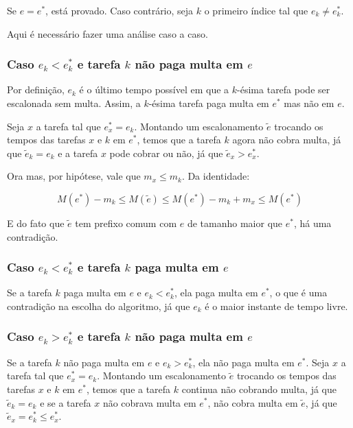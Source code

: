 Se $e = e^*$, está provado. Caso contrário, seja $k$ o primeiro índice tal que $e_k \neq e^*_k$.

Aqui é necessário fazer uma análise caso a caso.

\subsubsection*{Caso $e_k < e^*_k$ e tarefa $k$ não paga multa em $e$}

Por definição, $e_k$ é o último tempo possível em que a $k$-ésima tarefa pode ser escalonada sem multa. Assim, a $k$-ésima tarefa paga multa em $e^*$ mas não em $e$.

Seja $x$ a tarefa tal que $e^*_x = e_k$. Montando um escalonamento $\widetilde{e}$ trocando os tempos das tarefas $x$ e $k$ em $e^*$, temos que a tarefa $k$ agora não cobra multa, já que $\widetilde{e}_k = e_k$ e a tarefa $x$ pode cobrar ou não, já que $\widetilde{e}_x > e^*_x$.

Ora mas, por hipótese, vale que $m_x \leq m_k$. Da identidade:

$$M(e^*) - m_k \leq M(\widetilde{e}) \leq M(e^*) - m_k + m_x \leq M(e^*)$$

E do fato que $\widetilde{e}$ tem prefixo comum com $e$ de tamanho maior que $e^*$, há uma contradição.

\subsubsection*{Caso $e_k < e^*_k$ e tarefa $k$ paga multa em $e$}

Se a tarefa $k$ paga multa em $e$ e $e_k < e^*_k$, ela paga multa em $e^*$, o que é uma contradição na escolha do algoritmo, já que $e_k$ é o maior instante de tempo livre.

\subsubsection*{Caso $e_k > e^*_k$ e tarefa $k$ não paga multa em $e$}

Se a tarefa $k$ não paga multa em $e$ e $e_k > e^*_k$, ela não paga multa em $e^*$. Seja $x$ a tarefa tal que $e^*_x = e_k$. Montando um escalonamento $\widetilde{e}$ trocando os tempos das tarefas $x$ e $k$ em $e^*$, temos que a tarefa $k$ continua não cobrando multa, já que $\widetilde{e}_k = e_k$ e se a tarefa $x$ não cobrava multa em $e^*$, não cobra multa em $\widetilde{e}$, já que $\widetilde{e}_x = e^*_k \leq e^*_x$.

